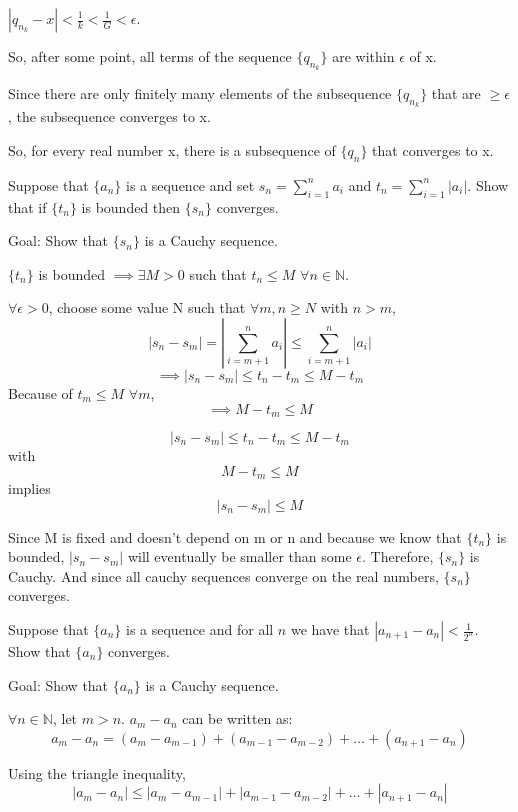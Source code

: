 \documentclass[answers]{exam}
\theoremstyle{remark}
\theoremstyle{definition}
\newcommand{\NN}{\mathbb{N}}
\begin{document}
\begin{questions}
\begin{solution}
$|q_{n_k} - x| < \frac{1}{k} < \frac{1}{G} < \epsilon$.

So, after some point, all terms of the sequence $\{q_{n_k}\}$
are within $\epsilon$ of x.

Since there are only finitely many elements of the subsequence $\{q_{n_k}\}$
that are $\geq \epsilon$, the subsequence converges to x.

So, for every real number x, there is a subsequence of $\{q_n\}$ that converges to x.


\end{solution}

\question Suppose that $\{a_n\}$ is a sequence and set $s_n= \sum_{i=1}^n a_i$ and $t_n= \sum_{i=1}^n |a_i|$. Show that if $\{t_n\}$ is bounded then $\{s_n\}$ converges. 

\begin{solution}

Goal: Show that $\{s_n\}$ is a Cauchy sequence.

$\{t_n\}$ is bounded $\implies \exists M > 0$ such that $t_n \leq M$ $\forall n \in \NN$.

$\forall \epsilon > 0$, choose some value N such that $\forall m, n \geq N$ with $n > m$,
\[|s_n - s_m| = |\sum_{i = m+1}^{n} a_i| \leq \sum_{i = m+1}^{n} |a_i|\]
\[\implies |s_n - s_m| \leq t_n - t_m \leq M - t_m\]
Because of $t_m \leq M$ $\forall m$,
\[\implies M - t_m \leq M\]

\[|s_n - s_m| \leq t_n - t_m \leq M - t_m\]
with
\[M - t_m \leq M\]
implies
\[|s_n - s_m| \leq M\]

Since M is fixed and doesn't depend on m or n and because we know that $\{t_n\}$
is bounded, $|s_n - s_m|$ will eventually be smaller than some $\epsilon$.
Therefore, $\{s_n\}$ is Cauchy. And since all cauchy sequences converge
on the real numbers, $\{s_n\}$ converges.


\end{solution}

\question Suppose that $\{a_n\}$ is a sequence and for all $n$ we have that $|a_{n+1}-a_n|< \frac{1}{2^n}$. Show that $\{a_n\}$ converges.
\begin{solution}

Goal: Show that $\{a_n\}$ is a Cauchy sequence.

$\forall n \in \NN$, let $m > n$. $a_m - a_n$ can be written as:
\[a_m - a_n = (a_m - a_{m-1}) + (a_{m-1} - a_{m-2}) + \dots + (a_{n+1} - a_n)\]

Using the triangle inequality,
\[|a_m - a_n| \leq |a_m - a_{m-1}| + |a_{m-1} - a_{m-2}| + \dots + |a_{n+1} - a_n|\]


\end{solution}
\end{questions}
\end{document}
